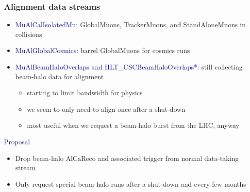 \documentclass[compress]{beamer}
\begin{document}
\begin{frame}
\frametitle{Alignment data streams}
\begin{itemize}
\item \textcolor{darkblue}{MuAlCalIsolatedMu:} GlobalMuons, TrackerMuons, and StandAloneMuons in collisions

\item \textcolor{darkblue}{MuAlGlobalCosmics:} barrel GlobalMuons for cosmics runs

\item \textcolor{darkblue}{MuAlBeamHaloOverlaps and HLT\_CSCBeamHaloOverlaps*:} still collecting beam-halo data for alignment
\begin{itemize}
\item starting to limit bandwidth for physics
\item we seem to only need to align once after a shut-down
\item most useful when we request a beam-halo burst from the LHC, anyway
\end{itemize}
\end{itemize}

\vfill
\hspace{-0.83 cm} \textcolor{darkblue}{\Large Proposal}

\vspace{0.1 cm}
\begin{itemize}
\item Drop beam-halo AlCaReco and associated trigger from normal data-taking stream
\item Only request special beam-halo runs after a shut-down and every few months
\end{itemize}
\end{frame}

\end{document}
